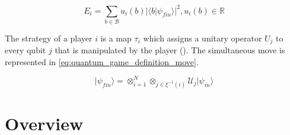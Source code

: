 \begin{equation}
E_{i}=\sum_{b \in \mathcal{B}} u_{i}(b)\vert \langle b\vert \psi_{fin}\rangle\vert^{2}, u_{i}(b) \in \mathbb{R}
\label{eq:quantum_game_definition_payoff_func}
\end{equation}

The strategy of a player $i$ is a map $\tau_{i}$ which assigns a
unitary operator $U_{j}$ to every qubit $j$ that is manipulated
by the player ().
The simultaneous move is represented in \ref{eq:quantum_game_definition_move}.

\begin{equation}
\vert\psi_{fin}\rangle=\otimes_{i=1}^{N}\otimes_{j\in\xi^{-1}(i)}\mathcal{U}_{j}\vert\psi_{in}\rangle\label{eq:quantum_game_definition_move}
\end{equation}

\section{Overview}
\label{sec:background_overview}

